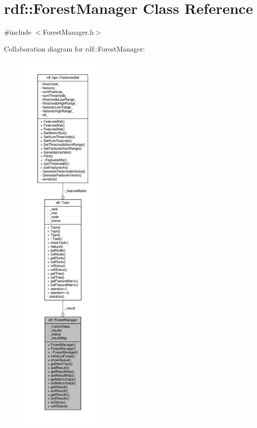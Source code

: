 \hypertarget{classrdf_1_1ForestManager}{}\section{rdf\+:\+:Forest\+Manager Class Reference}
\label{classrdf_1_1ForestManager}


{\ttfamily \#include $<$Forest\+Manager.\+h$>$}



Collaboration diagram for rdf\+:\+:Forest\+Manager\+:
\nopagebreak
\begin{figure}[H]
\begin{center}
\leavevmode
\includegraphics[height=550pt]{classrdf_1_1ForestManager__coll__graph}
\end{center}
\end{figure}
